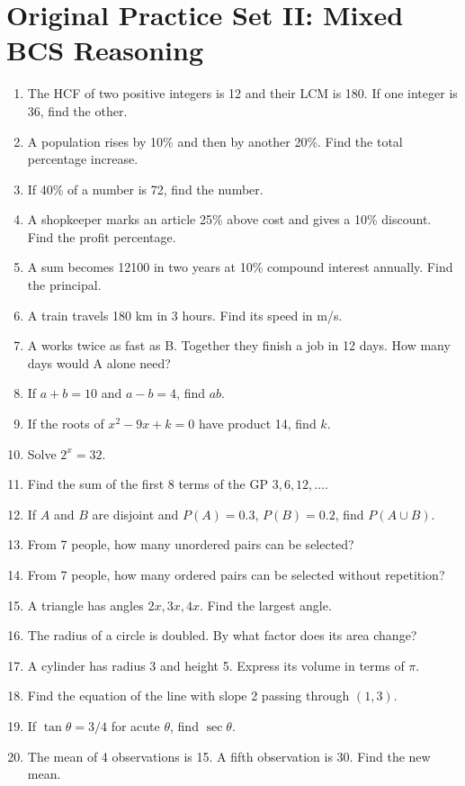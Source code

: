 \documentclass[12pt,a4paper,oneside]{book}
\begin{document}
\chapter[Practice II: Mixed Reasoning]{Original Practice Set II: Mixed BCS Reasoning}
\begin{enumerate}[label=\textbf{Q\arabic*.}, leftmargin=*]
\item The HCF of two positive integers is 12 and their LCM is 180. If one integer is 36, find the other.
\item A population rises by 10\% and then by another 20\%. Find the total percentage increase.
\item If 40\% of a number is 72, find the number.
\item A shopkeeper marks an article 25\% above cost and gives a 10\% discount. Find the profit percentage.
\item A sum becomes 12100 in two years at 10\% compound interest annually. Find the principal.
\item A train travels 180 km in 3 hours. Find its speed in m/s.
\item A works twice as fast as B. Together they finish a job in 12 days. How many days would A alone need?
\item If \(a+b=10\) and \(a-b=4\), find \(ab\).
\item If the roots of \(x^2-9x+k=0\) have product 14, find \(k\).
\item Solve \(2^{x}=32\).
\item Find the sum of the first 8 terms of the GP \(3,6,12,\ldots\).
\item If \(A\) and \(B\) are disjoint and \(P(A)=0.3\), \(P(B)=0.2\), find \(P(A\cup B)\).
\item From 7 people, how many unordered pairs can be selected?
\item From 7 people, how many ordered pairs can be selected without repetition?
\item A triangle has angles \(2x,3x,4x\). Find the largest angle.
\item The radius of a circle is doubled. By what factor does its area change?
\item A cylinder has radius 3 and height 5. Express its volume in terms of \(\pi\).
\item Find the equation of the line with slope 2 passing through \((1,3)\).
\item If \(\tan\theta=3/4\) for acute \(\theta\), find \(\sec\theta\).
\item The mean of 4 observations is 15. A fifth observation is 30. Find the new mean.
\end{enumerate}
\end{document}
